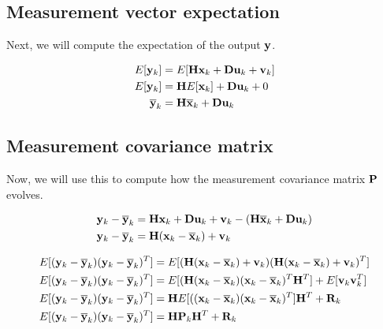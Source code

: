 \subsection{Measurement vector expectation}

Next, we will compute the expectation of the output $\mathbf{y}$.

\begin{align*}
  E[\mathbf{y}_k] &= E[\mathbf{H}\mathbf{x}_k + \mathbf{D}\mathbf{u}_k + \mathbf{v}_k] \\
  E[\mathbf{y}_k] &= \mathbf{H}E[\mathbf{x}_k] + \mathbf{D}\mathbf{u}_k + 0 \\
  \overline{\mathbf{y}}_k &= \mathbf{H}\overline{\mathbf{x}}_k + \mathbf{D}\mathbf{u}_k
\end{align*}

\subsection{Measurement covariance matrix}

Now, we will use this to compute how the measurement covariance matrix
$\mathbf{P}$ evolves.

\begin{align*}
  \mathbf{y}_k - \overline{\mathbf{y}}_k &= \mathbf{H}\mathbf{x}_k + \mathbf{D}\mathbf{u}_k + \mathbf{v}_k -
    (\mathbf{H}\overline{\mathbf{x}}_k + \mathbf{D}\mathbf{u}_k) \\
  \mathbf{y}_k - \overline{\mathbf{y}}_k &= \mathbf{H}(\mathbf{x}_k - \overline{\mathbf{x}}_k) + \mathbf{v}_k
\end{align*}

\begin{align*}
  E[(\mathbf{y}_k - \overline{\mathbf{y}}_k)(\mathbf{y}_k - \overline{\mathbf{y}}_k)^T] &=
    E[(\mathbf{H}(\mathbf{x}_k - \overline{\mathbf{x}}_k) + \mathbf{v}_k)
      (\mathbf{H}(\mathbf{x}_k - \overline{\mathbf{x}}_k) + \mathbf{v}_k)^T] \\
  E[(\mathbf{y}_k - \overline{\mathbf{y}}_k)(\mathbf{y}_k - \overline{\mathbf{y}}_k)^T] &=
    E[(\mathbf{H}(\mathbf{x}_k - \overline{\mathbf{x}}_k)
      (\mathbf{x}_k - \overline{\mathbf{x}}_k)^T\mathbf{H}^T] +
    E[\mathbf{v}_k\mathbf{v}_k^T] \\
  E[(\mathbf{y}_k - \overline{\mathbf{y}}_k)(\mathbf{y}_k - \overline{\mathbf{y}}_k)^T] &=
    \mathbf{H}E[((\mathbf{x}_k - \overline{\mathbf{x}}_k)(\mathbf{x}_k - \overline{\mathbf{x}}_k)^T]
    \mathbf{H}^T + \mathbf{R}_k \\
  E[(\mathbf{y}_k - \overline{\mathbf{y}}_k)(\mathbf{y}_k - \overline{\mathbf{y}}_k)^T] &=
    \mathbf{H}\mathbf{P}_k\mathbf{H}^T + \mathbf{R}_k
\end{align*}
